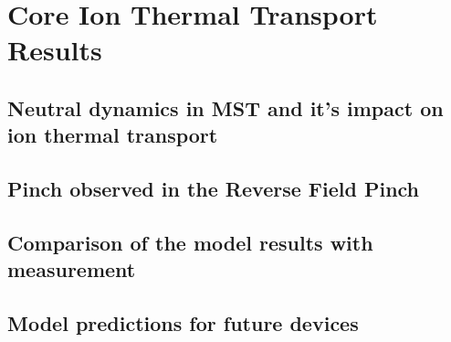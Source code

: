 \chapter{Core Ion Thermal Transport Results}

\section{Neutral dynamics in MST and it's impact on ion thermal transport}\label{sec:neutral_dynamics}

\section{Pinch observed in the Reverse Field Pinch}

\section{Comparison of the model results with measurement}

\section{Model predictions for future devices}